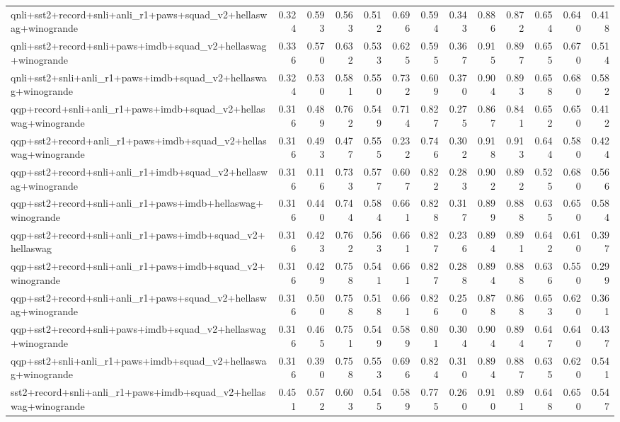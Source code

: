\begin{table}[t]
\begin{tabular}{lrrrrrrrrrrrr}
    qnli+sst2+record+snli+anli\_r1+paws+squad\_v2+hellaswag+winogrande & 0.324 & 0.593 & 0.563 & 0.512 & 0.696 & 0.594 & 0.343 & 0.886 & 0.872 & 0.654 & 0.640 & 0.418 \\
    qnli+sst2+record+snli+paws+imdb+squad\_v2+hellaswag+winogrande & 0.336 & 0.570 & 0.632 & 0.533 & 0.625 & 0.595 & 0.367 & 0.915 & 0.897 & 0.655 & 0.670 & 0.514 \\
    qnli+sst2+snli+anli\_r1+paws+imdb+squad\_v2+hellaswag+winogrande & 0.324 & 0.530 & 0.581 & 0.550 & 0.732 & 0.609 & 0.370 & 0.904 & 0.893 & 0.658 & 0.680 & 0.582 \\
    qqp+record+snli+anli\_r1+paws+imdb+squad\_v2+hellaswag+winogrande & 0.316 & 0.489 & 0.762 & 0.549 & 0.714 & 0.827 & 0.275 & 0.867 & 0.841 & 0.652 & 0.650 & 0.412 \\
    qqp+sst2+record+anli\_r1+paws+imdb+squad\_v2+hellaswag+winogrande & 0.316 & 0.493 & 0.477 & 0.555 & 0.232 & 0.746 & 0.302 & 0.918 & 0.913 & 0.644 & 0.580 & 0.424 \\
    qqp+sst2+record+snli+anli\_r1+imdb+squad\_v2+hellaswag+winogrande & 0.316 & 0.116 & 0.733 & 0.577 & 0.607 & 0.822 & 0.283 & 0.902 & 0.892 & 0.525 & 0.680 & 0.566 \\
    qqp+sst2+record+snli+anli\_r1+paws+imdb+hellaswag+winogrande & 0.316 & 0.440 & 0.744 & 0.584 & 0.661 & 0.828 & 0.317 & 0.899 & 0.888 & 0.635 & 0.650 & 0.584 \\
    qqp+sst2+record+snli+anli\_r1+paws+imdb+squad\_v2+hellaswag & 0.316 & 0.423 & 0.762 & 0.563 & 0.661 & 0.827 & 0.236 & 0.894 & 0.891 & 0.642 & 0.610 & 0.397 \\
    qqp+sst2+record+snli+anli\_r1+paws+imdb+squad\_v2+winogrande & 0.316 & 0.429 & 0.758 & 0.541 & 0.661 & 0.827 & 0.288 & 0.894 & 0.888 & 0.636 & 0.550 & 0.299 \\
    qqp+sst2+record+snli+anli\_r1+paws+squad\_v2+hellaswag+winogrande & 0.316 & 0.500 & 0.758 & 0.518 & 0.661 & 0.826 & 0.250 & 0.878 & 0.868 & 0.653 & 0.620 & 0.361 \\
    qqp+sst2+record+snli+paws+imdb+squad\_v2+hellaswag+winogrande & 0.316 & 0.465 & 0.751 & 0.549 & 0.589 & 0.801 & 0.304 & 0.904 & 0.894 & 0.647 & 0.640 & 0.437 \\
    qqp+sst2+snli+anli\_r1+paws+imdb+squad\_v2+hellaswag+winogrande & 0.316 & 0.390 & 0.758 & 0.553 & 0.696 & 0.824 & 0.310 & 0.894 & 0.887 & 0.635 & 0.620 & 0.541 \\
    sst2+record+snli+anli\_r1+paws+imdb+squad\_v2+hellaswag+winogrande & 0.451 & 0.572 & 0.603 & 0.545 & 0.589 & 0.775 & 0.260 & 0.910 & 0.891 & 0.648 & 0.650 & 0.547 \\

\end{tabular}
\end{table}
